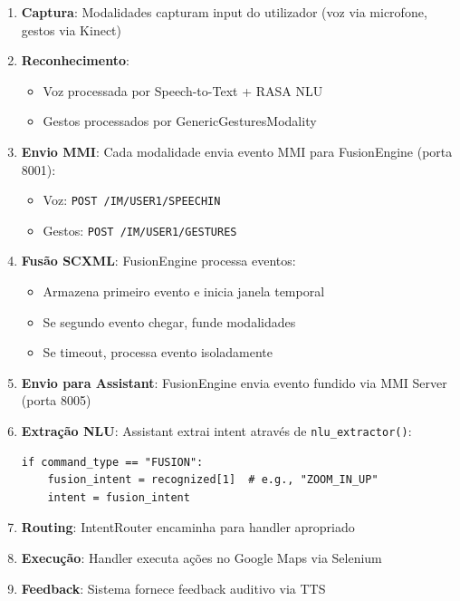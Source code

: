 \documentclass{report}
\begin{document}
\begin{enumerate}
    \item \textbf{Captura}: Modalidades capturam input do utilizador (voz via microfone, gestos via Kinect)

    \item \textbf{Reconhecimento}:
    \begin{itemize}
        \item Voz processada por Speech-to-Text + RASA NLU
        \item Gestos processados por GenericGesturesModality
    \end{itemize}

    \item \textbf{Envio MMI}: Cada modalidade envia evento MMI para FusionEngine (porta 8001):
    \begin{itemize}
        \item Voz: \texttt{POST /IM/USER1/SPEECHIN}
        \item Gestos: \texttt{POST /IM/USER1/GESTURES}
    \end{itemize}

    \item \textbf{Fusão SCXML}: FusionEngine processa eventos:
    \begin{itemize}
        \item Armazena primeiro evento e inicia janela temporal
        \item Se segundo evento chegar, funde modalidades
        \item Se timeout, processa evento isoladamente
    \end{itemize}

    \item \textbf{Envio para Assistant}: FusionEngine envia evento fundido via MMI Server (porta 8005)

    \item \textbf{Extração NLU}: Assistant extrai intent através de \texttt{nlu\_extractor()}:
\begin{verbatim}
if command_type == "FUSION":
    fusion_intent = recognized[1]  # e.g., "ZOOM_IN_UP"
    intent = fusion_intent
\end{verbatim}

    \item \textbf{Routing}: IntentRouter encaminha para handler apropriado

    \item \textbf{Execução}: Handler executa ações no Google Maps via Selenium

    \item \textbf{Feedback}: Sistema fornece feedback auditivo via TTS
\end{enumerate}
\end{document}
